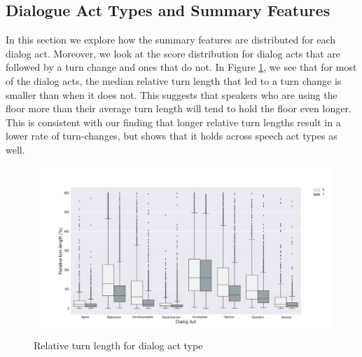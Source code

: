 \subsection{Dialogue Act Types and Summary Features}

In this section we explore how the summary features are distributed for each dialog act. Moreover, we look at the score distribution for dialog acts that are followed by a turn change and ones that do not. In Figure \ref{fig:act:turn:rtl}, we see that for most of the dialog acts,
the median relative turn length that led to a turn change is smaller than when it does not. This suggests that speakers who are using the floor more than their
average turn length will tend to hold the floor even longer. This is consistent with our finding that longer relative turn lengths result in a lower rate of turn-changes, but shows that it holds across speech act types as well.
%
\begin{figure}[ht!]
\centering
\includegraphics[width=\textwidth]{../scikitlearn/figures/f3.png}\vspace{-0.5em}
\caption{Relative turn length for dialog act type}
\label{fig:act:turn:rtl}
\end{figure}

